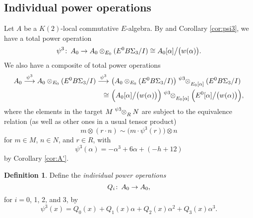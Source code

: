 \documentclass{gtpart}
\theoremstyle{definition}
\newtheorem{defn}[thm]{Definition}
\theoremstyle{remark}
\def\co{\colon\thinspace}
\newcommand{\A}{\alpha}
\newcommand{\p}{\psi^3}
\begin{document}
\subsection{Individual power operations}

Let $A$ be a $K(2)$-local commutative $E$-algebra.  
By \cite[3.23]{cong} and Corollary \ref{cor:psi3}, 
we have a total power operation 
\[
 \p \co A_0 \to A_0 \otimes_{E_0} (E^0 B\Sigma_3 / I) \cong A_0 [\A] \big/ \big( w(\A) \big).  
\]
We also have a composite of total power operations 
\begin{equation}
\label{psi3^2}
\begin{split}
 A_0 \stackrel{\p}{\longrightarrow} A_0 \otimes_{E_0} (E^0 B\Sigma_3 / I) \stackrel{\p}{\longrightarrow} 
 & ~ \big( A_0 \otimes_{E_0} (E^0 B\Sigma_3 / I) \big) \tensor[^\p]{\otimes}{_{E_0 [\A]}} (E^0 B\Sigma_3 / I) \\
\cong & ~ \Big( A_0 [\A] \big/ \big( w(\A) \big) \Big) \tensor[^\p]{\otimes}{_{E_0 [\A]}} \Big( E^0 [\A] \big/ \big( w(\A) \big) \Big), 
\end{split}
\end{equation}
where the elements in the target $M \tensor[^\p]{\otimes}{_R} N$ are subject to the equivalence relation (as well as other ones in a usual tensor product)
\[
 m \otimes (r \cdot n) \sim \big( m \cdot \p(r) \big) \otimes n 
\]
for $m \in M$, $n \in N$, and $r \in R$, with 
\[
 \p(\A) = -\A^3 + 6 \A + (-h + 12) 
\]
by Corollary \ref{cor:A'}.  

\begin{defn}
Define the {\em individual power operations} 
\[
 Q_i \co A_0 \to A_0, 
\]
for $i = 0$, 1, 2, and 3, by 
\[
 \p (x) = Q_0(x) + Q_1(x) \A + Q_2(x) \A^2 + Q_3(x) \A^3.  
\]
\end{defn}
\end{document}
